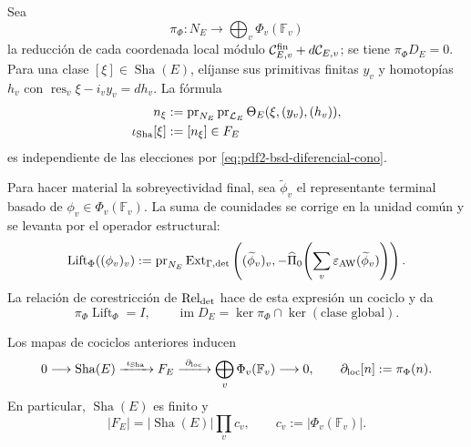 Sea
\begin{equation}\label{eq:pdf2-bsd-pi-componentes}
 \pi_\Phi:N_E\longrightarrow\bigoplus_v\Phi_v(\mathbb F_v)
\end{equation}
la reducción de cada coordenada local módulo
$\mathcal C_{E,v}^{\rm fin}+d\mathcal C_{E,v}$; se tiene
$\pi_\Phi D_E=0$. Para una clase
$[\xi]\in\operatorname{Sha}(E)$, elíjanse sus primitivas finitas
$y_v$ y homotopías $h_v$ con
$\operatorname{res}_v\xi-i_vy_v=dh_v$. La fórmula
\begin{equation}\label{eq:pdf2-bsd-iota-sha-cociclos}
 \begin{aligned}
 n_\xi&:=\operatorname{pr}_{N_E}\operatorname{pr}_{\mathcal L_E}
       \Theta_E(\xi,(y_v),(h_v)),\\
 \iota_{\rm Sha}[\xi]&:=[n_\xi]\in F_E
 \end{aligned}
\end{equation}
es independiente de las elecciones por
\eqref{eq:pdf2-bsd-diferencial-cono}.

Para hacer material la sobreyectividad final, sea
$\widetilde\phi_v$ el representante terminal basado de
$\phi_v\in\Phi_v(\mathbb F_v)$. La suma de counidades se corrige en la
unidad común y se levanta por el operador estructural:
\begin{equation}\label{eq:pdf2-bsd-lift-componentes}
 \operatorname{Lift}_\Phi((\phi_v)_v):=
 \operatorname{pr}_{N_E}\operatorname{Ext}_{\Gamma,{\rm det}}
 \left((\widetilde\phi_v)_v,
 -\widehat\Pi_0\!\left(\sum_v
       \varepsilon_{\rm AW}(\widetilde\phi_v)\right)\right).
\end{equation}
La relación de corestricción de
$\operatorname{Rel}_{\rm det}$ hace de esta expresión un cociclo y da
\begin{equation}\label{eq:pdf2-bsd-lift-dos-identidades}
 \pi_\Phi\operatorname{Lift}_\Phi=I,
 \qquad
 \operatorname{im}D_E=
 \ker\pi_\Phi\cap\ker(\text{clase global}).
\end{equation}

\begin{theorem}
\label{thm:pdf2-bsd-sha-tamagawa}
Los mapas de cociclos anteriores inducen
\begin{equation}\label{eq:pdf2-bsd-sha-tamagawa}
 0\longrightarrow\operatorname{Sha}(E)
 \xrightarrow{\ \iota_{\rm Sha}\ }F_E
 \xrightarrow{\ \partial_{\rm loc}\ }
 \bigoplus_v\Phi_v(\mathbb F_v)
 \longrightarrow0,
 \qquad
 \partial_{\rm loc}[n]:=\pi_\Phi(n).
\end{equation}
En particular, $\operatorname{Sha}(E)$ es finito y
\begin{equation}\label{eq:pdf2-bsd-cardinal-sts}
 |F_E|=|\operatorname{Sha}(E)|\prod_vc_v,
 \qquad c_v:=|\Phi_v(\mathbb F_v)|.
\end{equation}
\end{theorem}

